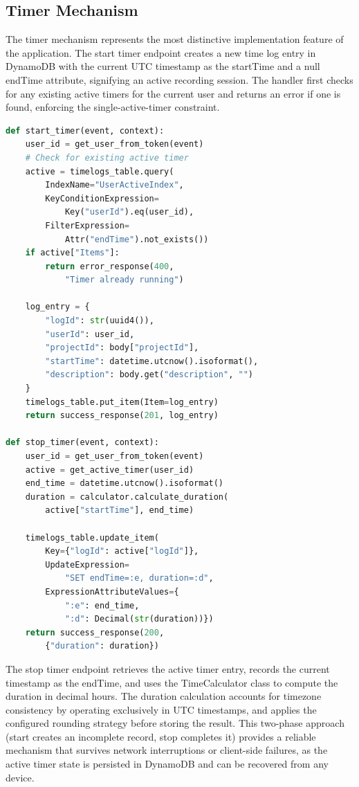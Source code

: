 \documentclass[conference]{IEEEtran}
\begin{document}
\subsection{Timer Mechanism}

The timer mechanism represents the most distinctive implementation feature of the application. The start timer endpoint creates a new time log entry in DynamoDB with the current UTC timestamp as the startTime and a null endTime attribute, signifying an active recording session. The handler first checks for any existing active timers for the current user and returns an error if one is found, enforcing the single-active-timer constraint.

\begin{lstlisting}[language=Python, caption={Timer start and stop implementation}]
def start_timer(event, context):
    user_id = get_user_from_token(event)
    # Check for existing active timer
    active = timelogs_table.query(
        IndexName="UserActiveIndex",
        KeyConditionExpression=
            Key("userId").eq(user_id),
        FilterExpression=
            Attr("endTime").not_exists())
    if active["Items"]:
        return error_response(400,
            "Timer already running")

    log_entry = {
        "logId": str(uuid4()),
        "userId": user_id,
        "projectId": body["projectId"],
        "startTime": datetime.utcnow().isoformat(),
        "description": body.get("description", "")
    }
    timelogs_table.put_item(Item=log_entry)
    return success_response(201, log_entry)

def stop_timer(event, context):
    user_id = get_user_from_token(event)
    active = get_active_timer(user_id)
    end_time = datetime.utcnow().isoformat()
    duration = calculator.calculate_duration(
        active["startTime"], end_time)

    timelogs_table.update_item(
        Key={"logId": active["logId"]},
        UpdateExpression=
            "SET endTime=:e, duration=:d",
        ExpressionAttributeValues={
            ":e": end_time,
            ":d": Decimal(str(duration))})
    return success_response(200,
        {"duration": duration})
\end{lstlisting}

The stop timer endpoint retrieves the active timer entry, records the current timestamp as the endTime, and uses the TimeCalculator class to compute the duration in decimal hours. The duration calculation accounts for timezone consistency by operating exclusively in UTC timestamps, and applies the configured rounding strategy before storing the result. This two-phase approach (start creates an incomplete record, stop completes it) provides a reliable mechanism that survives network interruptions or client-side failures, as the active timer state is persisted in DynamoDB and can be recovered from any device.
\end{document}
